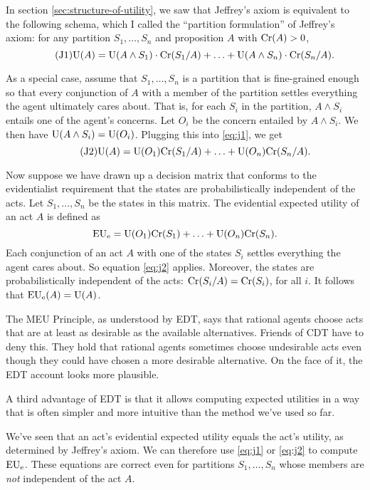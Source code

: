 In section \ref{sec:structure-of-utility}, we saw that Jeffrey's axiom is
equivalent to the following schema, which I called the ``partition formulation''
of Jeffrey's axiom: for any partition $S_{1},\ldots,S_{n}$ and proposition $A$
with $\text{Cr}(A) > 0$,
\begin{equation}\tag{J1}\label{eq:j1}
  \text{U}(A) = \text{U}(A \land S_1)\cdot \text{Cr}(S_{1}/A) + \ldots + \text{U}(A \land S_{n})\cdot\text{Cr}(S_{n}/A).
\end{equation}

As a special case, assume that $S_{1},\ldots,S_{n}$ is a partition that is
fine-grained enough so that every conjunction of $A$ with a member of the
partition settles everything the agent ultimately cares about. That is, for each
$S_{i}$ in the partition, $A \land S_{i}$ entails one of the agent's concerns.
Let $O_{i}$ be the concern entailed by $A \land S_{i}$. We then have
$\text{U}(A \land S_{i}) = \text{U}(O_{i})$. Plugging this into \eqref{eq:j1}, we
get
\begin{equation}\tag{J2}\label{eq:j2}
  \text{U}(A) = \text{U}(O_{1})\text{Cr}(S_{1}/A) + \ldots +\text{U}(O_{n})\text{Cr}(S_{n}/A).
\end{equation}

Now suppose we have drawn up a decision matrix that conforms to the
evidentialist requirement that the states are probabilistically independent of
the acts. Let $S_{1},\ldots,S_{n}$ be the states in this matrix. The evidential
expected utility of an act $A$ is defined as
\[
  \text{EU}_\text{e} = \text{U}(O_{1})\text{Cr}(S_{1}) + \ldots + \text{U}(O_{n})\text{Cr}(S_{n}).
\]
Each conjunction of an act $A$ with one of the states $S_{i}$ settles everything
the agent cares about. So equation \eqref{eq:j2} applies. Moreover, the states
are probabilistically independent of the acts: $\text{Cr}(S_{i}/A) = \text{Cr}(S_{i})$, for
all $i$. It follows that $\text{EU}_\text{e}(A) = \text{U}(A)$.

The MEU Principle, as understood by EDT, says that rational agents choose acts
that are at least as desirable as the available alternatives. Friends of CDT
have to deny this. They hold that rational agents sometimes choose undesirable
acts even though they could have chosen a more desirable alternative. On the
face of it, the EDT account looks more plausible.

A third advantage of EDT is that it allows computing expected utilities in a way
that is often simpler and more intuitive than the method we've used so far.

We've seen that an act's evidential expected utility equals the act's utility,
as determined by Jeffrey's axiom. We can therefore use \eqref{eq:j1} or
\eqref{eq:j2} to compute $\text{EU}_\text{e}$. These equations are correct even for
partitions $S_{1},\ldots,S_{n}$ whose members are \emph{not} independent of the
act $A$.


